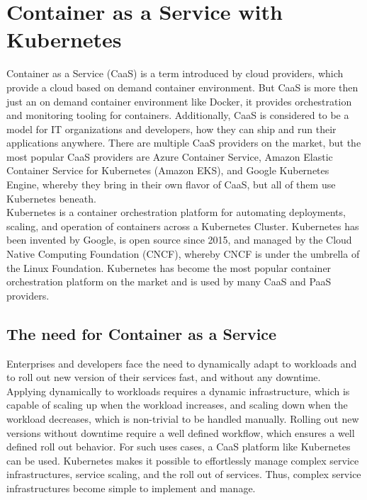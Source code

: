 \chapter{Container as a Service with Kubernetes}
\label{cha:caas}
Container as a Service (CaaS) is a term introduced by cloud providers, which provide a cloud based on demand container environment. But CaaS is more then just an on demand container environment like Docker, it provides orchestration and monitoring tooling for containers. Additionally, CaaS is considered to be a model for IT organizations and developers, how they can ship and run their applications anywhere. There are multiple CaaS providers on the market, but the most popular CaaS providers are Azure Container Service, Amazon Elastic Container Service for Kubernetes (Amazon EKS), and Google Kubernetes Engine, whereby they bring in their own flavor of CaaS, but all of them use Kubernetes beneath\cite{CNCFKubernetes2018, MicrosoftAzureAKS2018, AmazonWebServicesEKS2018, GoogleCloudKE2018}. \\

Kubernetes is a container orchestration platform for automating deployments, scaling, and operation of containers across a Kubernetes Cluster. Kubernetes has been invented by Google, is open source since 2015, and managed by the Cloud Native Computing Foundation (CNCF), whereby CNCF is under the umbrella of the Linux Foundation. Kubernetes has become the most popular container orchestration platform on the market and is used by many CaaS and PaaS providers\cite{CNCF2018}.

\section{The need for Container as a Service}
\label{sec:caas-need-for-caas}
Enterprises and developers face the need to dynamically adapt to workloads and to roll out new version of their services fast, and without any downtime. Applying dynamically to workloads requires a dynamic infrastructure, which is capable of scaling up when the workload increases, and scaling down when the workload decreases, which is non-trivial to be handled manually. Rolling out new versions without downtime require a well defined workflow, which ensures a well defined roll out behavior. For such uses cases, a CaaS platform like Kubernetes can be used. Kubernetes makes it possible to effortlessly manage complex service infrastructures, service scaling, and the roll out of services. Thus, complex service infrastructures become simple to implement and manage.
\newpage

